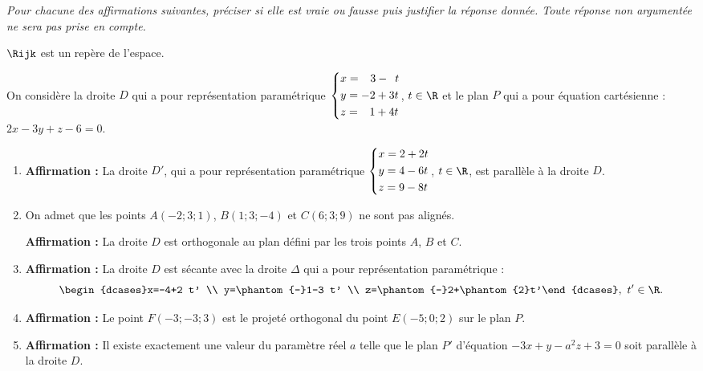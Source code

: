 \textit{Pour chacune des affirmations suivantes, préciser si elle est vraie ou fausse puis justifier la réponse donnée. Toute réponse non argumentée ne sera pas prise en compte.}

\medskip

$\Rijk$ est un repère de l'espace.

On considère la droite $D$ qui a pour représentation paramétrique $\begin{dcases}x=\phantom{-}3-\phantom{3}t\\y=-2 + 3t\\z=\phantom{-}1 + 4t\end{dcases}$, $t \in \R$ et le plan $P$ qui a pour équation cartésienne : $2x -3y + z - 6 = 0$.

\begin{enumerate}
	\item \textbf{Affirmation :} 
	La droite $D'$, qui a pour représentation paramétrique $\begin{dcases}x=2+2 t\\y=4-6 t \\z=9-8 t\end{dcases}$, $t \in \R$, est parallèle à la droite $D$.
	\item On admet que les points $A(-2;3;1)$, $B(1;3;-4)$ et $C(6;3;9)$ ne sont pas alignés.
	
	\textbf{Affirmation :} La droite $D$ est orthogonale au plan défini par les trois points $A$, $B$ et $C$.	
	\item \textbf{Affirmation :} La droite $D$ est sécante avec la droite $\Delta$ qui a pour représentation paramétrique :\[\begin{dcases}x=-4+2 t' \\ y=\phantom{-}1-3 t' \\ z=\phantom{-}2+\phantom{2}t'\end{dcases},~t' \in \R.\]
	\item \textbf{Affirmation :} Le point $F(-3;-3;3)$ est le projeté orthogonal du point $E(-5;0;2)$ sur le plan $P$.
	\item \textbf{Affirmation :} Il existe exactement une valeur du paramètre réel $a$ telle que le plan $P'$ d'équation ${-3x + y - a^{2} z+3=0}$ soit parallèle à la droite $D$.
\end{enumerate}